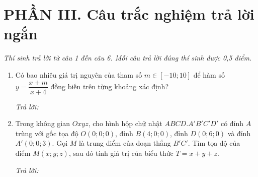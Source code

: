 \documentclass[12pt,a4paper]{article}
\newcommand{\otraloi}{\par\nobreak\smallskip\noindent\textit{Trả lời:}\quad\fbox{\rule{0pt}{11pt}\makebox[0.3cm]{}}\,\fbox{\rule{0pt}{11pt}\makebox[0.3cm]{}}\,\fbox{\rule{0pt}{11pt}\makebox[0.3cm]{}}\,\fbox{\rule{0pt}{11pt}\makebox[0.3cm]{}}}
\begin{document}
\vspace{3pt}
\section*{\large PHẦN III. Câu trắc nghiệm trả lời ngắn}
\textit{Thí sinh trả lời từ câu 1 đến câu 6. Mỗi câu trả lời đúng thí sinh được 0,5 điểm.}
\begin{enumerate}
\item Có bao nhiêu giá trị nguyên của tham số $m\in[-10;10]$ để hàm số $y=\dfrac{x+m}{x+4}$ đồng biến trên từng khoảng xác định?
\otraloi

\item Trong không gian $Oxyz$, cho hình hộp chữ nhật $ABCD.A'B'C'D'$ có đỉnh $A$ trùng với gốc tọa độ $O(0;0;0)$, đỉnh $B(4;0;0)$, đỉnh $D(0;6;0)$ và đỉnh $A'(0;0;3)$. Gọi $M$ là trung điểm của đoạn thẳng $B'C'$. Tìm tọa độ của điểm $M(x;y;z)$, sau đó tính giá trị của biểu thức $T=x+y+z$.
\otraloi
\end{enumerate}
\end{document}
